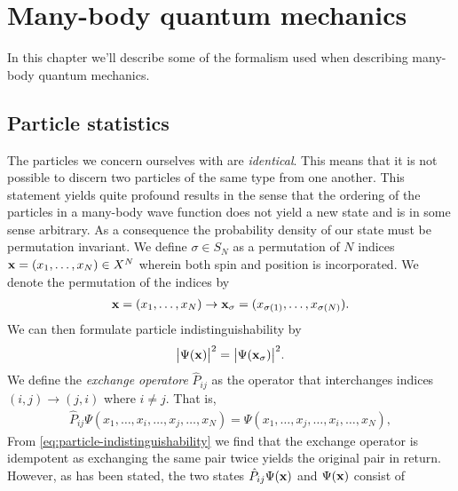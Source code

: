 \chapter{Many-body quantum mechanics}
    In this chapter we'll describe some of the formalism used when describing
    many-body quantum mechanics.

    \section{Particle statistics}
        The particles we concern ourselves with are \emph{identical}.
        This means that it is not possible to discern two particles of the
        same type from one another.
        This statement yields quite profound results in the sense
        that the ordering of the particles in a many-body wave function does
        not yield a new state and is in some sense arbitrary.
        As a consequence the probability density of our state must be
        permutation invariant.
        We define $\sigma \in S_{N}$ as a permutation of $N$ indices $\mathbf{x}
        = (x_1, \dots, x_N) \in X^{N}$ wherein both spin and position is
        incorporated.
        We denote the permutation of the indices by
        \begin{align}
            \mathbf{x} = (x_1, \dots, x_N)
            \to \mathbf{x}_{\sigma} = (x_{\sigma(1)}, \dots, x_{\sigma(N)}).
        \end{align}
        We can then formulate particle indistinguishability by
        \cite{leinaas1977, kvaal2017notes}
        \begin{align}
            \abs{
                \Psi(\mathbf{x})
            }^2
            = \abs{
                \Psi(\mathbf{x}_{\sigma})
            }^2.
            \label{eq:particle-indistinguishability}
        \end{align}
        We define the \emph{exchange operatore} $\hat{P}_{ij}$ as the
        operator that interchanges indices $(i, j) \to (j, i)$ where $i \neq
        j$.
        That is,
        \begin{align}
            \hat{P}_{ij}\Psi(x_1, \dots, x_i, \dots, x_j, \dots, x_N)
            = \Psi(x_1, \dots, x_j, \dots, x_i, \dots, x_N),
        \end{align}
        From \autoref{eq:particle-indistinguishability} we find that the
        exchange operator is idempotent as exchanging the same pair twice
        yields the original pair in return.
        However, as has been stated, the two states
        $\hat{P}_{ij}\Psi(\mathbf{x})$ and $\Psi(\mathbf{x})$ consist of
